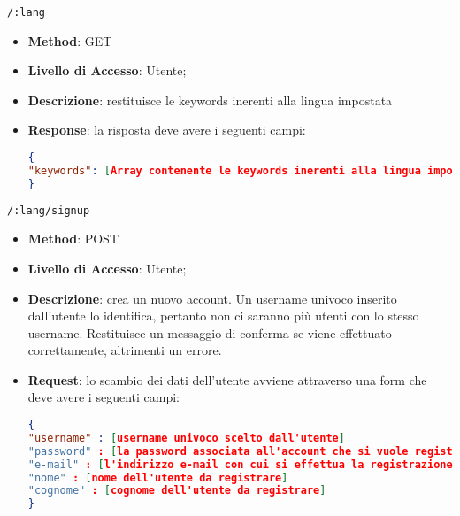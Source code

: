 	\item \texttt{/:lang}
		\begin{itemize}
			\item \textbf{Method}: GET
			\item \textbf{Livello di Accesso}: Utente;
			\item \textbf{Descrizione}: restituisce le keywords inerenti alla lingua impostata
			\item \textbf{Response}: la risposta deve avere i seguenti campi:
\begin{lstlisting}[language=json,firstnumber=1]
{
"keywords": [Array contenente le keywords inerenti alla lingua impostata ]
}
\end{lstlisting}
		\end{itemize}
	
	
	\item \texttt{/:lang/signup}
		\begin{itemize}
			\item \textbf{Method}: POST
			\item \textbf{Livello di Accesso}: Utente;
			\item \textbf{Descrizione}: crea un nuovo account. Un username univoco inserito dall'utente lo identifica, pertanto non ci saranno più utenti con lo stesso username. Restituisce un messaggio di conferma se viene effettuato correttamente, altrimenti un errore.
			\item \textbf{Request}: lo scambio dei dati dell'utente avviene attraverso una form che deve avere i seguenti campi:
\begin{lstlisting}[language=json,firstnumber=1]
{
"username" : [username univoco scelto dall'utente]
"password" : [la password associata all'account che si vuole registrare]
"e-mail" : [l'indirizzo e-mail con cui si effettua la registrazione]
"nome" : [nome dell'utente da registrare]
"cognome" : [cognome dell'utente da registrare]
}
\end{lstlisting}
		\end{itemize}